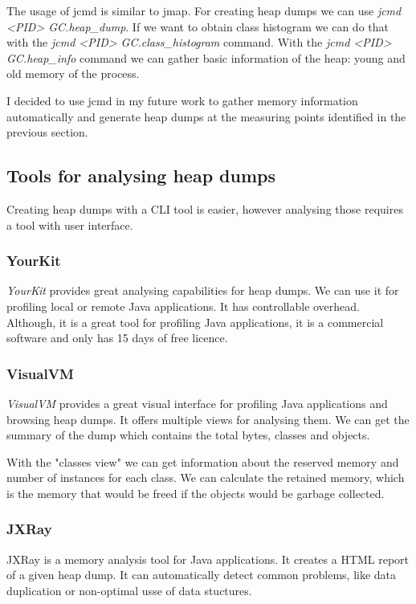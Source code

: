 The usage of jcmd is similar to jmap. For creating heap dumps we can use \textit{jcmd <PID> GC.heap\_dump}. If we want to obtain class histogram we can do that with the \textit{jcmd <PID> GC.class\_histogram} command. With the \textit{jcmd <PID> GC.heap\_info} command we can gather basic information of the heap: \eg young and old memory of the process.

I decided to use jcmd in my future work to gather memory information automatically and generate heap dumps at the measuring points identified in the previous section.

\subsection{Tools for analysing heap dumps}
Creating heap dumps with a CLI tool is easier, however analysing those requires a tool with user interface. 

\subsubsection{YourKit}
\textit{YourKit} provides great analysing capabilities for heap dumps. We can use it for profiling local or remote Java applications. It has controllable overhead. Although, it is a great tool for profiling Java applications, it is a commercial software and only has 15 days of free licence.

\subsubsection{VisualVM}
\textit{VisualVM} provides a great visual interface for profiling Java applications and browsing heap dumps. It offers multiple views for analysing them. We can get the summary of the dump which contains the total bytes, classes and objects. 

With the "classes view" we can get information about the reserved memory and number of instances for each class. We can calculate the retained memory, which is the memory that would be freed if the objects would be garbage collected.

\subsubsection{JXRay}
JXRay \cite{jxray} is a memory analysis tool for Java applications. It creates a HTML report of a given heap dump. It can automatically detect common problems, like data duplication or non-optimal usse of data stuctures. 


